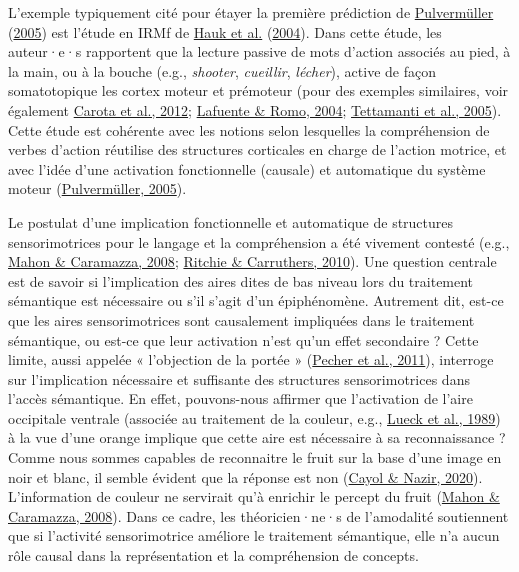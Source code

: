 \documentclass[
  a4paper,12pt,twoside,onecolumn,openright,final,oldfontcommands]{memoir}
\begin{document}
L'exemple typiquement cité pour étayer la première prédiction de \protect\hyperlink{ref-pulvermuller_brain_2005}{Pulvermüller} (\protect\hyperlink{ref-pulvermuller_brain_2005}{2005}) est l'étude en IRMf de \protect\hyperlink{ref-hauk_somatotopic_2004}{Hauk et al.} (\protect\hyperlink{ref-hauk_somatotopic_2004}{2004}). Dans cette étude, les auteur·e·s rapportent que la lecture passive de mots d'action associés au pied, à la main, ou à la bouche (e.g., \emph{shooter}, \emph{cueillir}, \emph{lécher}), active de façon somatotopique les cortex moteur et prémoteur (pour des exemples similaires, voir également \protect\hyperlink{ref-carota_body-part-specific_2012}{Carota et al., 2012}; \protect\hyperlink{ref-de_lafuente_language_2004}{Lafuente \& Romo, 2004}; \protect\hyperlink{ref-tettamanti_listening_2005-1}{Tettamanti et al., 2005}). Cette étude est cohérente avec les notions selon lesquelles la compréhension de verbes d'action réutilise des structures corticales en charge de l'action motrice, et avec l'idée d'une activation fonctionnelle (causale) et automatique du système moteur (\protect\hyperlink{ref-pulvermuller_brain_2005}{Pulvermüller, 2005}).

Le postulat d'une implication fonctionnelle et automatique de structures sensorimotrices pour le langage et la compréhension a été vivement contesté (e.g., \protect\hyperlink{ref-mahon_critical_2008}{Mahon \& Caramazza, 2008}; \protect\hyperlink{ref-ritchie_massive_2010}{Ritchie \& Carruthers, 2010}). Une question centrale est de savoir si l'implication des aires dites de bas niveau lors du traitement sémantique est nécessaire ou s'il s'agit d'un épiphénomène. Autrement dit, est-ce que les aires sensorimotrices sont causalement impliquées dans le traitement sémantique, ou est-ce que leur activation n'est qu'un effet secondaire ? Cette limite, aussi appelée « l'objection de la portée » (\protect\hyperlink{ref-pecher_abstract_2011}{Pecher et al., 2011}), interroge sur l'implication nécessaire et suffisante des structures sensorimotrices dans l'accès sémantique. En effet, pouvons-nous affirmer que l'activation de l'aire occipitale ventrale (associée au traitement de la couleur, e.g., \protect\hyperlink{ref-lueck_colour_1989}{Lueck et al., 1989}) à la vue d'une orange implique que cette aire est nécessaire à sa reconnaissance ? Comme nous sommes capables de reconnaitre le fruit sur la base d'une image en noir et blanc, il semble évident que la réponse est non (\protect\hyperlink{ref-cayol_why_2020}{Cayol \& Nazir, 2020}). L'information de couleur ne servirait qu'à enrichir le percept du fruit (\protect\hyperlink{ref-mahon_critical_2008}{Mahon \& Caramazza, 2008}). Dans ce cadre, les théoricien·ne·s de l'amodalité soutiennent que si l'activité sensorimotrice améliore le traitement sémantique, elle n'a aucun rôle causal dans la représentation et la compréhension de concepts.
\end{document}
